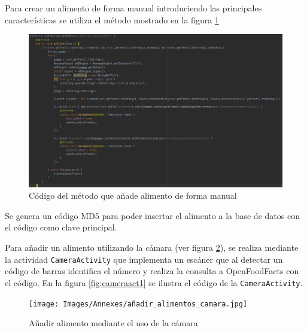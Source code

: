Para crear un alimento de forma manual introduciendo las principales características se utiliza el método mostrado en la figura \ref{fig:addmanual}

\begin{figure}[H]
    \centering
    \includegraphics[width=\textwidth]{Images/Capitulo7/addmanual.png}
        \caption{Código del método que añade alimento de forma manual}
    \label{fig:addmanual}
\end{figure}

Se genera un código MD5 para poder insertar el alimento a la base de datos con el código como clave principal.

Para añadir un alimento utilizando la cámara (ver figura \ref{fig:camara_action}), se realiza mediante la actividad \texttt{CameraActivity} que implementa un escáner \cite{code_scanner} que al detectar un código de barras identifica el número y realiza la consulta a OpenFoodFacts con el código. En la figura \ref{fig:cameraact1} se ilustra el código de la \texttt{CameraActivity}.

\begin{figure}[H]
    \centering
    \texttt{[image: Images/Annexes/añadir\_alimentos\_camara.jpg]}
    \caption{Añadir alimento mediante el uso de la cámara}
    \label{fig:camara_action}
\end{figure}

